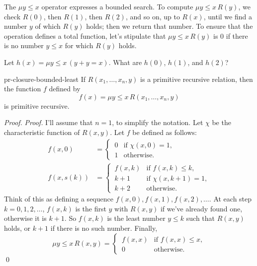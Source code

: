 The $\mu y \leq x$ operator expresses a bounded search.
To compute $\mu y \leq x \,R(y)$,
we check $R(0)$, then $R(1)$, then $R(2)$, and so on,
up to $R(x)$,
until we find a number $y$ of which $R(y)$ holds;
then we return that number.
To ensure that
the operation defines a total function,
let's stipulate that
$\mu y \leq x \,R(y)$ is 0 if there is no number $y \leq x$ for which $R(y)$ holds.

\begin{exercise}
  Let $h(x) = \mu y \!\leq\! x\, (y + y = x)$.
  What are $h(0)$, $h(1)$, and $h(2)$?
\end{exercise}

\begin{proposition}{}{pr-closure-bounded-least}
  If $R(x_1, \ldots, x_n, y)$ is a primitive recursive relation,
  then the function $f$ defined by
  \[
    f(x) = \mu y \leq x \,R(x_1, \ldots, x_n, y)
  \]
  is primitive recursive.
\end{proposition}
\begin{proof}
  \emph{Proof.}
  I'll assume that $n=1$, to simplify the notation.
  Let $\chi$ be the characteristic function of $R(x,y)$.
  Let $f$ be defined as follows:
  \begin{align*}
    f(x,0) &= \begin{cases}
      \,0 & \text{if } \chi(x,0) = 1,\\
      \,1 & \text{otherwise}.
    \end{cases}\\
    f(x,s(k)) &=
    \begin{cases}
      \,f(x,k) & \text{if } f(x,k) \leq k,\\
      \,k + 1 & \text{if } \chi(x,k+1) = 1,\\
      \,k + 2 & \text{otherwise.}
    \end{cases}
  \end{align*}
  Think of this as defining a sequence $f(x,0), f(x,1), f(x,2), \ldots$.
  At each step $k = 0,1,2,\ldots$,
  $f(x,k)$ is the first $y$ with $R(x,y)$ if we've already found one,
  otherwise it is $k+1$.
  So $f(x,k)$ is the least number $y \leq k$ such that $R(x,y)$ holds,
  or $k + 1$ if there is no such number.
  Finally,
  \[
    \mu y \leq x \,R(x,y) = \begin{cases}
      \, f(x,x) & \text{if } f(x,x) \leq x,\\
      \,0 & \text{otherwise.}
    \end{cases}
  \]
  \qed
\end{proof}


